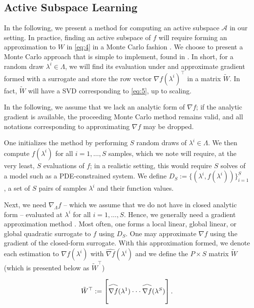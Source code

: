 \documentclass{amsart}
\newcommand{\A}{\mathcal{A}}
\newcommand\reallywidehat[1]{\arraycolsep=0pt\relax%
\begin{array}{c}
\stretchto{
  \scaleto{
    \scalerel*[\widthof{\ensuremath{#1}}]{\kern-.5pt\bigwedge\kern-.5pt}
    {\rule[-\textheight/2]{1ex}{\textheight}} %
  }{\textheight} %
}{0.5ex}\\           %
#1\\                 %
\rule{-1ex}{0ex}
\end{array}
}
\begin{document}
\subsection{Active Subspace Learning}

In the following, we present a method for computing an active subspace $\A$ in our setting. In practice, finding an active subspace of $f$ will require forming an approximation to $W$ in \eqref{eq:4} in a Monte Carlo fashion \cite{ConstantineMC}. We choose to present a Monte Carlo approach that is simple to implement, found in \cite{Russi}. In short, for a random draw $\lambda^i \in \Lambda$, we will find its evaluation under and approximate gradient formed with a surrogate and store the row vector $\nabla f(\lambda^i)^\top$ in a matrix $\tilde{W}$. In fact, $\tilde{W}$ will have a SVD corresponding to \eqref{eq:5}, up to scaling.

In the following, we assume that we lack an analytic form of $\nabla f$; if the analytic gradient is available, the proceeding Monte Carlo method remains valid, and all notations corresponding to approximating $\nabla f$ may be dropped.


One initializes the method by performing $S$ random draws of $\lambda^i \in \Lambda$. We then compute $f(\lambda^i)$ for all $i=1,\ldots,S$ samples, which we note will require, at the very least, $S$ evaluations of $f$; in a realistic setting, this would require $S$ solves of a model such as a PDE-constrained system. We define $D_S:=\{(\lambda^i,f(\lambda^i))\}_{i=1}^S$, a set of $S$ pairs of samples $\lambda^i$ and their function values. 

Next, we need $\nabla_\Lambda f$ -- which we assume that we do not have in closed analytic form -- evaluated at $\lambda^i$ for all $i=1,\ldots,S$. Hence, we generally need a gradient approximation method \cite{Constantine2015, Smith}. Most often, one forms a local linear, global linear, or global quadratic surrogate to $f$ using $D_S$. One may approximate $\nabla f$ using the gradient of the closed-form surrogate. With this approximation formed, we denote each estimation to $\nabla f(\lambda^i)$ with $\hat{\nabla f}(\lambda^i)$ and we define the $P \times S$ matrix $\tilde{W}$ (which is presented below as $\tilde{W}^\top$)

\begin{equation} \label{eq:16}
\tilde{W}^\top:=\begin{bmatrix}
\reallywidehat{\nabla f}(\lambda^1)
\cdot \cdot \cdot
\reallywidehat{\nabla f}(\lambda^S)\\
\end{bmatrix}.
\end{equation}  
\end{document}
